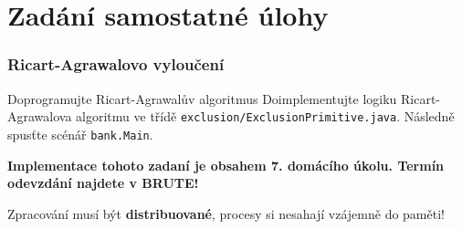 \documentclass[usenames,dvipsnames,9pt]{beamer}
\begin{document}
%
%
%
%


\section{Zadání samostatné úlohy}

{
\begin{frame}
  \frametitle{Ricart-Agrawalovo vyloučení}

\begin{block}{Doprogramujte Ricart-Agrawalův algoritmus}
    Doimplementujte logiku Ricart-Agrawalova algoritmu ve třídě \texttt{exclusion/ExclusionPrimitive.java}. Následně spusťte scénář \texttt{bank.Main}.
  \end{block}

  \vspace{1em}

  \faWarning \hspace{3mm} {\bf Implementace tohoto zadaní je obsahem 7. domácího úkolu. Termín odevzdání najdete v BRUTE!}


\vspace{2em}

  Zpracování musí být {\bf distribuované}, procesy si nesahají vzájemně do paměti!


\vspace{1.5em}


\end{frame}
}
\end{document}
